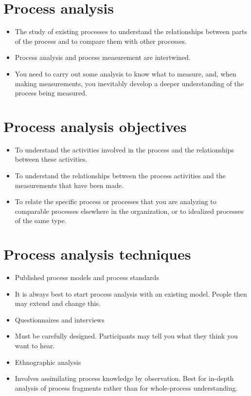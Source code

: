 \section{Process analysis}
\begin{itemize}

\item The study of existing processes to understand the relationships between parts of the process and to compare them with other processes.

\item Process analysis and process measurement are intertwined.

\item You need to carry out some analysis to know what to measure, and, when making measurements, you inevitably develop a deeper understanding of the process being measured.

\end{itemize}

\section{Process analysis objectives}
\begin{itemize}

\item To understand the activities involved in the process and the relationships between these activities.

\item To understand the relationships between the process activities and the measurements that have been made.

\item To relate the specific process or processes that you are analyzing to comparable processes elsewhere in the organization, or to idealized processes of the same type.


\end{itemize}

\section{Process analysis techniques}
\begin{itemize}
\item Published process models and process standards

   \item It is always best to start process analysis with an existing model. People then may extend and change this.

\item Questionnaires and interviews

   \item Must be carefully designed. Participants may tell you what they think you want to hear.

\item Ethnographic analysis

   \item Involves assimilating process knowledge by observation. Best for in-depth analysis of process fragments rather than for whole-process understanding.

\end{itemize}
\newpage
